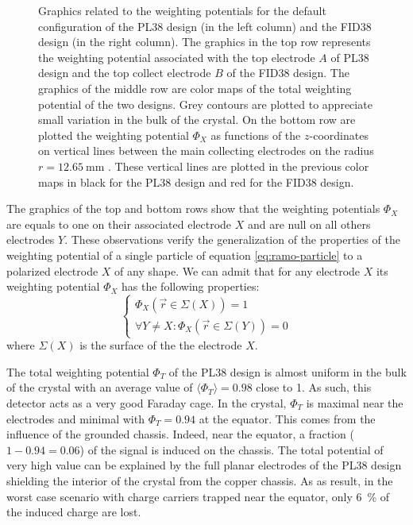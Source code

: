 \begin{figure}
\begin{minipage}{0.48\textwidth}
\end{minipage}
\caption{Graphics related to the weighting potentials for the default configuration of the PL38 design (in the left column) and the FID38 design (in the right column). The graphics in the top row represents the weighting potential associated with the top electrode $A$ of PL38 design and the top collect electrode $B$ of the FID38 design. The graphics of the middle row are color maps of the total weighting potential of the two designs. Grey contours are plotted to appreciate small variation in the bulk of the crystal. On the bottom row are plotted the weighting potential $\Phi_X$ as functions of the $z$-coordinates on vertical lines between the main collecting electrodes on the radius $r=\SI{12.65}{\mm}$ . These vertical lines are plotted in the previous color maps in black for the PL38 design and red for the FID38 design.}
\label{fig:pl38-fid38-weighting-potential}
\end{figure}

The graphics of the top and bottom rows show that the weighting potentials $\Phi_X$ are equals to one on their associated electrode $X$ and are null on all others electrodes $Y$. These observations verify the generalization of the properties of the weighting potential of a single particle of equation \ref{eq:ramo-particle} to a polarized electrode $X$ of any shape. We can admit that for any electrode $X$ its weighting potential $\Phi_X$ has the following properties:
\begin{equation}
\label{eq:ramo-electrode}
\begin{cases}
\Phi_X \left( \vec{r} \in \Sigma(X) \right) = 1 \\
\forall Y \neq X: \Phi_X \left( \vec{r} \in \Sigma(Y) \right) = 0
\end{cases}
\end{equation} 
where $\Sigma(X)$ is the surface of the the electrode $X$.


The total weighting potential $\Phi_T$ of the PL38 design is almost uniform in the bulk of the crystal with an average value of $\langle \Phi_T \rangle = 0.98$ close to 1. As such, this detector acts as a very good Faraday cage. In the crystal, $\Phi_T$ is maximal near the electrodes and minimal with $\Phi_T = 0.94$ at the equator. This comes from the influence of the grounded chassis. Indeed, near the equator, a fraction ($1-0.94=0.06$) of the signal is induced on the chassis. The total potential of very high value can be explained by the full planar electrodes of the PL38 design shielding the interior of the crystal from the copper chassis. As as result, in the worst case scenario with charge carriers trapped near the equator, only \SI{6}{\percent} of the induced charge are lost.

